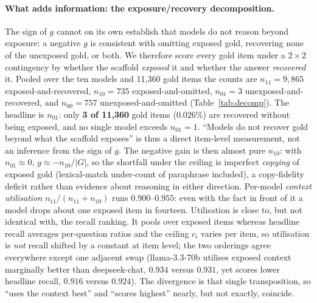 \documentclass[10pt,twocolumn]{article}
\begin{document}
\paragraph{What adds information: the exposure/recovery decomposition.} The sign of $g$ cannot on its
own establish that models do not reason beyond exposure: a negative $g$ is consistent with omitting
exposed gold, recovering none of the unexposed gold, or both. We therefore score every gold item under
a $2\times2$ contingency by whether the scaffold \emph{exposed} it and whether the answer
\emph{recovered} it. Pooled over the ten models and 11{,}360 gold items the counts are
$n_{11}=9{,}865$ exposed-and-recovered, $n_{10}=735$ exposed-and-omitted, $n_{01}=3$
unexposed-and-recovered, and $n_{00}=757$ unexposed-and-omitted (Table~\ref{tab:decomp}). The headline
is $n_{01}$: only \textbf{3 of 11{,}360} gold items ($0.026\%$) are recovered without being exposed,
and no single model exceeds $n_{01}=1$. ``Models do not recover gold beyond what the scaffold
exposes'' is thus a direct item-level measurement, not an inference from the sign of $g$. The negative
gain is then almost pure $n_{10}$: with $n_{01}\approx0$, $g\approx-n_{10}/|G|$, so the shortfall under
the ceiling is imperfect \emph{copying} of exposed gold (lexical-match under-count of paraphrase
included), a copy-fidelity deficit rather than evidence about reasoning in either direction. Per-model
\emph{context utilisation} $n_{11}/(n_{11}+n_{10})$ runs $0.900$--$0.955$: even with the fact in front
of it a model drops about one exposed item in fourteen. Utilisation is close to, but not identical
with, the recall ranking. It pools over exposed items whereas headline recall averages per-question
ratios and the ceiling $c_i$ varies per item, so utilisation is \emph{not} recall shifted by a
constant at item level; the two orderings agree everywhere except one adjacent swap (llama-3.3-70b
utilises exposed context marginally better than deepseek-chat, $0.934$ versus $0.931$, yet scores lower
headline recall, $0.916$ versus $0.924$). The divergence is that single transposition, so ``uses the
context best'' and ``scores highest'' nearly, but not exactly, coincide.
\end{document}
